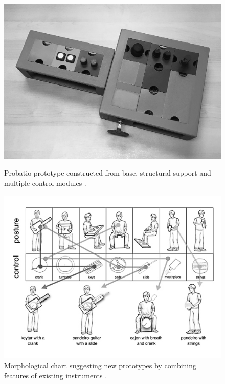 \documentclass[letterpaper, 12pt]{article}
\begin{document}
\begin{figure}[htbp]
    \begin{minipage}{0.49\textwidth}
        \centering
        \includegraphics[width=1\textwidth]{probatio_assembly.jpg}
        \caption{Probatio prototype constructed from base, structural support and multiple control modules \citep{Calegario2020}.}
        \label{fig:probatio-assembly}
    \end{minipage}\hfill
    \begin{minipage}{0.49\textwidth}
        \centering
        \includegraphics[width=1\textwidth]{probatio_chart.jpg}
        \caption{Morphological chart suggesting new prototypes by combining features of existing instruments \citep{Calegario2020}.}
        \label{fig:probatio-chart}
    \end{minipage}
\end{figure}
\end{document}
